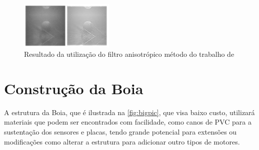 \begin{figure}[ht]
	\centering
    \caption{\label{fig:anisotop}Resultado da utilização do filtro anisotrópico método do trabalho de }
	\includegraphics[width = 0.4\textwidth]{resources/anisitrop.png}
\end{figure}







\section{Construção da Boia}

A estrutura da Boia, que é ilustrada na \autoref{fig:bigpic}, que visa baixo custo, utilizará materiais que podem ser encontrados com facilidade, como canos de PVC para a sustentação dos sensores e placas, tendo grande potencial para extensões ou modificações como alterar a estrutura para adicionar outro tipos de motores.



